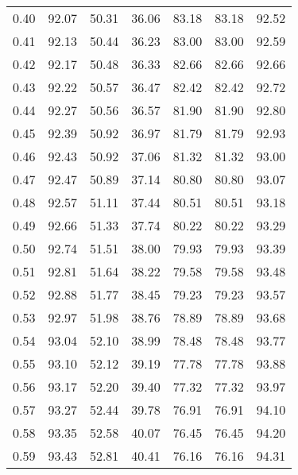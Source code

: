 \begin{tabular}{|c|c|c|c|c|c|c|}
      0.40 &     92.07 &     50.31 &      36.06 &   83.18 &      83.18 &         92.52 \\
      0.41 &     92.13 &     50.44 &      36.23 &   83.00 &      83.00 &         92.59 \\
      0.42 &     92.17 &     50.48 &      36.33 &   82.66 &      82.66 &         92.66 \\
      0.43 &     92.22 &     50.57 &      36.47 &   82.42 &      82.42 &         92.72 \\
      0.44 &     92.27 &     50.56 &      36.57 &   81.90 &      81.90 &         92.80 \\
      0.45 &     92.39 &     50.92 &      36.97 &   81.79 &      81.79 &         92.93 \\
      0.46 &     92.43 &     50.92 &      37.06 &   81.32 &      81.32 &         93.00 \\
      0.47 &     92.47 &     50.89 &      37.14 &   80.80 &      80.80 &         93.07 \\
      0.48 &     92.57 &     51.11 &      37.44 &   80.51 &      80.51 &         93.18 \\
      0.49 &     92.66 &     51.33 &      37.74 &   80.22 &      80.22 &         93.29 \\
      0.50 &     92.74 &     51.51 &      38.00 &   79.93 &      79.93 &         93.39 \\
      0.51 &     92.81 &     51.64 &      38.22 &   79.58 &      79.58 &         93.48 \\
      0.52 &     92.88 &     51.77 &      38.45 &   79.23 &      79.23 &         93.57 \\
      0.53 &     92.97 &     51.98 &      38.76 &   78.89 &      78.89 &         93.68 \\
      0.54 &     93.04 &     52.10 &      38.99 &   78.48 &      78.48 &         93.77 \\
      0.55 &     93.10 &     52.12 &      39.19 &   77.78 &      77.78 &         93.88 \\
      0.56 &     93.17 &     52.20 &      39.40 &   77.32 &      77.32 &         93.97 \\
      0.57 &     93.27 &     52.44 &      39.78 &   76.91 &      76.91 &         94.10 \\
      0.58 &     93.35 &     52.58 &      40.07 &   76.45 &      76.45 &         94.20 \\
      0.59 &     93.43 &     52.81 &      40.41 &   76.16 &      76.16 &         94.31 \\

\end{tabular}
